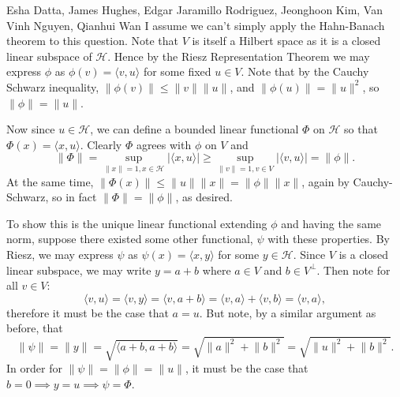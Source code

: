 

\begin{solution}{Esha Datta, James Hughes, Edgar Jaramillo Rodriguez, Jeonghoon Kim, Van Vinh Nguyen, Qianhui Wan}
        I assume we can't simply apply the Hahn-Banach theorem to this question.
        Note that $V$ is itself a Hilbert space as it is a closed linear subspace of $\mathcal{H}$.
        Hence by the Riesz Representation Theorem we may express $\phi$ as $\phi(v) = \langle v, u \rangle$ for some fixed $u\in V$.
        Note that by the Cauchy Schwarz inequality, $\lVert \phi(v) \rVert \leq \lVert v \rVert\lVert u \rVert$, and $\lVert \phi(u) \rVert = \lVert u \rVert^2$, so $\lVert \phi \rVert = \lVert u \rVert$.

        Now since $u\in \mathcal{H}$, we can define a bounded linear functional $\Phi$ on $\mathcal{H}$ so that $\Phi(x) = \langle x, u \rangle$.
        Clearly $\Phi$ agrees with $\phi$ on $V$ and
        \[ \lVert \Phi \rVert = \sup_{\lVert x \rVert=1, x\in \mathcal{H}} |\langle x, u \rangle| \geq \sup_{\lVert v \rVert=1, v\in V} |\langle v, u \rangle| = \lVert \phi \rVert. \]
        At the same time, $\lVert \Phi(x) \rVert \leq \lVert u \rVert\lVert x \rVert = \lVert \phi \rVert\lVert x \rVert$, again by Cauchy-Schwarz, so in fact $\lVert \Phi \rVert = \lVert \phi \rVert$, as desired. 

        To show this is the unique linear functional extending $\phi$ and having the same norm, suppose there existed some other functional, $\psi$ with these properties.
        By Riesz, we may express $\psi$ as $\psi(x) = \langle x,y\rangle$ for some $y\in \mathcal{H}$.
        Since $V$ is a closed linear subspace, we may write $y = a+b$ where $a\in V$ and $b\in V^\perp$.
        Then note for all $v\in V$:
        \begin{equation*}
            \langle v, u \rangle = \langle v,y\rangle = \langle v, a+b \rangle = \langle v,a \rangle +\langle v,b \rangle = \langle v,a \rangle, 
        \end{equation*}
        therefore it must be the case that $a=u$.
        But note, by a similar argument as before, that 
        \begin{equation*}
            \lVert \psi \rVert = \lVert y \rVert = \sqrt{\langle a+b,a+b \rangle} = \sqrt{\lVert a \rVert^2+\lVert b \rVert^2} = \sqrt{\lVert u \rVert^2+\lVert b \rVert^2}.
        \end{equation*}
        In order for $\lVert \psi \rVert = \lVert \phi \rVert =\lVert u \rVert$, it must be the case that $b =0 \implies y =u \implies \psi = \Phi$. 
\end{solution}

